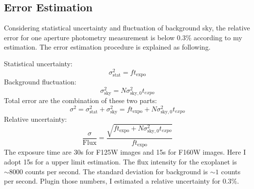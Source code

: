 \documentclass[paper=letter, fontsize=11pt]{scrartcl} %
\numberwithin{equation}{section} %
\numberwithin{figure}{section} %
\numberwithin{table}{section} %
\begin{document}
\subsection{Error Estimation}
Considering statistical uncertainty and fluctuation of background sky,
the relative error for one aperture photometry measurement is below
0.3\% according to my estimation. The error estimation procedure is
explained as following.\par

Statistical uncertainty:
\begin{equation}
  \sigma_{\mathrm{stat}}^{2}=ft_{\mathrm{expo}}
\end{equation}
Background fluctuation:
\begin{equation}
  \sigma_{\mathrm{sky}}^{2}=N\sigma_{\mathrm{sky,0}}^{2}t_{expo}
\end{equation}
Total error are the combination of these two parts:
\begin{equation}
  \sigma^{2} = \sigma_{\mathrm{stat}}^{2}+\sigma_{\mathrm{sky}}^{2}=ft_{\mathrm{expo}}+N\sigma_{\mathrm{sky,0}}^{2}t_{expo}
\end{equation}
Relative uncertainty:
\begin{equation}
  \frac{\sigma}{\mathrm{Flux}} = \frac{\sqrt{ft_{\mathrm{expo}}+N\sigma_{\mathrm{sky,0}}^{2}t_{expo}}}{ft_{\mathrm{expo}}}
\end{equation}
The exposure time are 30s for F125W images and 15s for F160W
images. Here I adopt 15s for a upper limit estimation. The flux
intensity for the exoplanet is $\sim 8000$ counts per second. The
standard deviation for background is $\sim 1$ counts per
second. Plugin those numbers, I estimated a relative uncertainty for 0.3\%.
\end{document}

